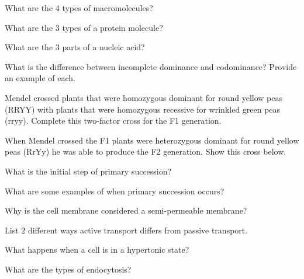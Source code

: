 \documentclass{exam}
\begin{document}
\begin{questions}
\question What are the 4 types of macromolecules?

\vspace{20mm}

\question What are the 3 types of a protein molecule?

\vspace{20mm}

\question What are the 3 parts of a nucleic acid?

\vspace{20mm}

\question What is the difference between incomplete dominance and codominance? Provide an example of each.

\vspace{20mm}

\question Mendel crossed plants that were homozygous dominant for round yellow peas (RRYY) with plants that were homozygous recessive for wrinkled green peas (rryy). Complete this two-factor cross for the F1  generation.

\vspace{20mm}

\question When Mendel crossed the F1 plants were heterozygous dominant for round yellow peas (RrYy) he was able to produce the F2 generation. Show this cross below.

\vspace{20mm}

\question What is the initial step of primary succession?

\vspace{20mm}

\question What are some examples of when primary succession occurs?

\vspace{20mm}

\question Why is the cell membrane considered a semi-permeable membrane?

\vspace{20mm}

\question List 2 different ways active transport differs from passive transport.

\vspace{20mm}

\question What happens when a cell is in a hypertonic state?

\vspace{20mm}

\question What are the types of endocytosis?


\end{questions}
\end{document}
